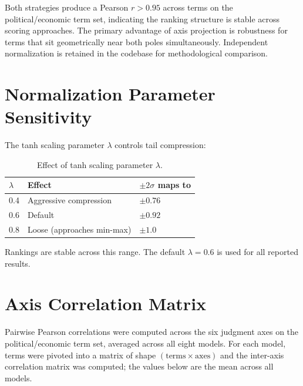 \documentclass[11pt, letterpaper]{article}
\begin{document}
Both strategies produce a Pearson $r > 0.95$ across terms on the political/economic term set, indicating the ranking structure is stable across scoring approaches. The primary advantage of axis projection is robustness for terms that sit geometrically near both poles simultaneously. Independent normalization is retained in the codebase for methodological comparison.

\section{Normalization Parameter Sensitivity}

The tanh scaling parameter $\lambda$ controls tail compression:

\begin{table}[H]
  \centering
  \begin{tabular}{lll}
    \toprule
    $\lambda$ & Effect & $\pm 2\sigma$ maps to \\
    \midrule
    0.4 & Aggressive compression & $\pm 0.76$ \\
    0.6 & Default                & $\pm 0.92$ \\
    0.8 & Loose (approaches min-max) & $\pm 1.0$ \\
    \bottomrule
  \end{tabular}
  \caption{Effect of tanh scaling parameter $\lambda$.}
  \label{tab:lambda}
\end{table}

Rankings are stable across this range. The default $\lambda = 0.6$ is used for all reported results.

\section{Axis Correlation Matrix}
\label{app:axis_correlation}

Pairwise Pearson correlations were computed across the six judgment axes on the political/economic term set, averaged across all eight models. For each model, terms were pivoted into a matrix of shape $(\text{terms} \times \text{axes})$ and the inter-axis correlation matrix was computed; the values below are the mean across all models.
\end{document}
